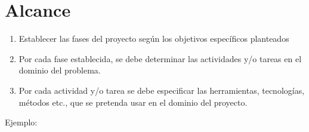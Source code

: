 \chapter{Alcance}
\label{Alcance}

\begin{enumerate}
    \item Establecer las fases del proyecto según los objetivos específicos planteados
    \item Por cada fase establecida, se debe determinar las actividades y/o tareas en el dominio del problema.
    \item Por cada actividad y/o tarea se debe especificar las herramientas, tecnologías, métodos etc., que se pretenda usar en el dominio del proyecto.
\end{enumerate}

Ejemplo:

